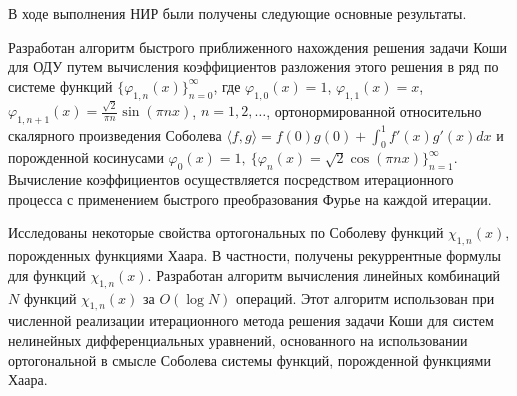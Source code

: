 ﻿\Conclusion

В ходе выполнения НИР были получены следующие основные результаты.
%


Разработан алгоритм быстрого приближенного нахождения решения задачи Коши для ОДУ путем вычисления коэффициентов разложения этого решения в ряд по системе функций $\{\varphi_{1,n}(x)\}_{n=0}^{\infty}$, где $ \varphi_{1,0}(x)=1$, $\varphi_{1,1}(x)=x$, $\varphi_{1,n+1}(x)=\frac{\sqrt{2}}{\pi n}\sin(\pi nx)$, $n=1,2,\ldots$,
ортонормированной относительно скалярного произведения Соболева $\langle f, g\rangle=f(0)g(0)+\int_0^1f'(x)g'(x)dx$ и порожденной
косинусами $\varphi_0(x)=1,\ \{\varphi_n(x)=\sqrt{2}\cos(\pi nx)\}_{n=1}^\infty$.
Вычисление коэффициентов осуществляется посредством итерационного процесса с применением быстрого преобразования Фурье на каждой итерации.

Исследованы некоторые свойства ортогональных по Соболеву функций $\chi_{1,n}(x)$, порожденных функциями Хаара. В частности, получены рекуррентные формулы для функций $\chi_{1,n}(x)$. Разработан алгоритм вычисления линейных комбинаций $N$ функций $\chi_{1,n}(x)$ за $O(\log N)$ операций. Этот алгоритм использован при численной реализации итерационного метода решения задачи Коши для систем нелинейных дифференциальных уравнений, основанного на использовании ортогональной в смысле Соболева системы функций, порожденной функциями Хаара.

